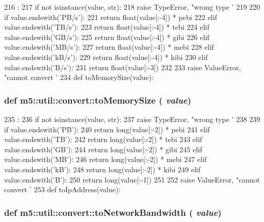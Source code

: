 \begin{DoxyCode}
216                             :
217     if not isinstance(value, str):
218         raise TypeError, "wrong type '%
219 
220     if value.endswith('PB/s'):
221         return float(value[:-4]) * pebi
222     elif value.endswith('TB/s'):
223         return float(value[:-4]) * tebi
224     elif value.endswith('GB/s'):
225         return float(value[:-4]) * gibi
226     elif value.endswith('MB/s'):
227         return float(value[:-4]) * mebi
228     elif value.endswith('kB/s'):
229         return float(value[:-4]) * kibi
230     elif value.endswith('B/s'):
231         return float(value[:-3])
232 
233     raise ValueError, "cannot convert '%
234 
def toMemorySize(value):
\end{DoxyCode}
\hypertarget{namespacem5_1_1util_1_1convert_a7ab42fd0e97802bfce49d88ca103cc0d}{
\subsubsection[{toMemorySize}]{\setlength{\rightskip}{0pt plus 5cm}def m5::util::convert::toMemorySize ( {\em value})}}
\label{namespacem5_1_1util_1_1convert_a7ab42fd0e97802bfce49d88ca103cc0d}



\begin{DoxyCode}
235                        :
236     if not isinstance(value, str):
237         raise TypeError, "wrong type '%
238 
239     if value.endswith('PB'):
240         return long(value[:-2]) * pebi
241     elif value.endswith('TB'):
242         return long(value[:-2]) * tebi
243     elif value.endswith('GB'):
244         return long(value[:-2]) * gibi
245     elif value.endswith('MB'):
246         return long(value[:-2]) * mebi
247     elif value.endswith('kB'):
248         return long(value[:-2]) * kibi
249     elif value.endswith('B'):
250         return long(value[:-1])
251 
252     raise ValueError, "cannot convert '%
253 
def toIpAddress(value):
\end{DoxyCode}
\hypertarget{namespacem5_1_1util_1_1convert_a2bc4a1bd1507f58d8e84b682539726f8}{
\subsubsection[{toNetworkBandwidth}]{\setlength{\rightskip}{0pt plus 5cm}def m5::util::convert::toNetworkBandwidth ( {\em value})}}
\label{namespacem5_1_1util_1_1convert_a2bc4a1bd1507f58d8e84b682539726f8}



